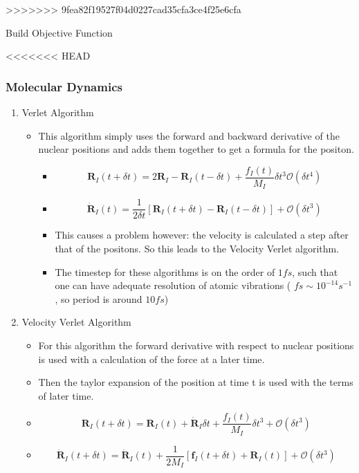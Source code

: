\documentclass[11pt]{article}
\begin{document}
\begin{enumerate}
>>>>>>> 9fea82f19527f04d0227cad35cfa3ce4f25e6cfa

 Build Objective Function

<<<<<<< HEAD
\subsubsection{Molecular Dynamics}
\label{sec:org1be89d1}

\begin{enumerate}
\item Verlet Algorithm
\label{sec:orgec16b17}
\begin{itemize}
\item This algorithm simply uses the forward and backward derivative of the
nuclear positions and adds them together to get a formula for the
positon.
\begin{itemize}
\item \[ \mathbf{R}_{I}(t + \delta t) = 2\mathbf{R}_{I} -
         \mathbf{R}_{I}(t - \delta t) + \frac{f_I(t)}{M_{I}}\delta t^3 \mathcal{O}(\delta t^{4})  \]
\item \[ \mathbf{\dot{R}}_{I}(t) = \frac{1}{2 \delta t} [
         \mathbf{R}_{I}(t + \delta t) - \mathbf{R}_{I}(t - \delta t) ] + \mathcal{O}(\delta t^{3})  \]
\item This causes a problem however: the velocity is calculated a step
after that of the positons. So this leads to the Velocity Verlet
algorithm.
\item The timestep for these algorithms is on the order of \(1fs\), such that
one can have adequate resolution of atomic vibrations ( \(fs \sim 10^{-14}s^{-1}\), so period is around \(10fs\))
\end{itemize}
\end{itemize}

\item Velocity Verlet Algorithm
\label{sec:orgc382d76}
\begin{itemize}
\item For this algorithm the forward derivative with respect to nuclear
positions is used with a calculation of the force at a later time.
\item Then the taylor expansion of the position at time t is used with the
terms of later time.
\item \[ \mathbf{R}_{I}(t + \delta t) = \mathbf{R}_{I}(t) +
       \mathbf{\dot{R}}_{I}\delta t + \frac{f_I(t)}{M_{I}}\delta t^3 + \mathcal{O}(\delta t^{3})  \]
\item \[ \mathbf{ \dot{R} }_{I}(t + \delta t) = \mathbf{\dot{R}}_{I}(t) +  \frac{1}{2 M_{I}} [ \mathbf{f}_{I}(t + \delta t) + \mathbf{R}_{I}(t)  ] + \mathcal{O}(\delta t^{3})  \]
\end{itemize}


\end{enumerate}
\end{enumerate}
\end{document}
